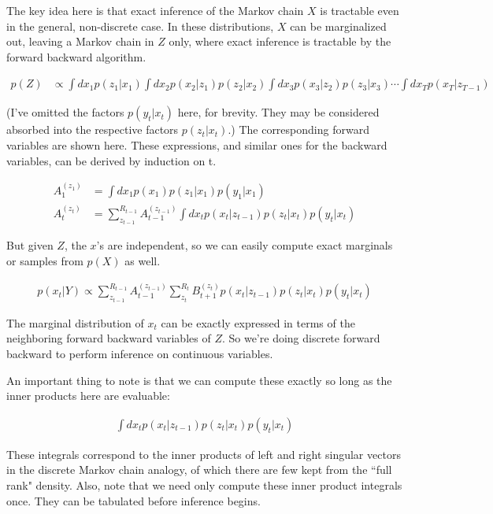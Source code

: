 \documentclass[11pt]{article}
\begin{document}
The key idea here is that exact inference of the Markov chain $X$ is tractable even in the general, non-discrete case. In these distributions, $X$ can be marginalized out, leaving a Markov chain in $Z$ only, where exact inference is tractable by the forward backward algorithm.

\begin{align*}
p(Z) &\propto \int dx_1 p(z_1|x_1) \int dx_2 p(x_2|z_1) p(z_2|x_2) \int dx_3 p(x_3|z_2) p(z_3|x_3) \cdots \int dx_T p(x_T|z_{T-1})
\end{align*}

\noindent (I've omitted the factors $p(y_t|x_t)$ here, for brevity. They may be considered absorbed into the respective factors $p(z_t|x_t)$.) The corresponding forward variables are shown here. These expressions, and similar ones for the backward variables, can be derived by induction on t.

\begin{align*}
A_1^{(z_1)} &= \int dx_1 p(x_1) p(z_1|x_1) p(y_1|x_1)\\
A_t^{(z_t)} &= \sum_{z_{t-1}}^{R_{t-1}} A_{t-1}^{(z_{t-1})} \int dx_t p(x_t|z_{t-1}) p(z_t|x_t) p(y_t|x_t)
\end{align*}

\noindent But given $Z$, the $x$'s are independent, so we can easily compute exact marginals or samples from $p(X)$ as well.

\begin{align*}
p(x_t|Y) \propto \sum_{z_{t-1}}^{R_{t-1}} A_{t-1}^{(z_{t-1})} \sum_{z_t}^{R_t} B_{t+1}^{(z_t)} p(x_t|z_{t-1}) p(z_t|x_t) p(y_t|x_t)
\end{align*}

\noindent The marginal distribution of $x_t$ can be exactly expressed in terms of the neighboring forward backward variables of $Z$. So we’re doing discrete forward backward to perform inference on continuous variables.

An important thing to note is that we can compute these exactly so long as the inner products here are evaluable:

\begin{align*}
\int dx_t p(x_t|z_{t-1}) p(z_t|x_t) p(y_t|x_t)
\end{align*}

\noindent These integrals correspond to the inner products of left and right singular vectors in the discrete Markov chain analogy, of which there are few kept from the ``full rank" density. Also, note that we need only compute these inner product integrals once. They can be tabulated before inference begins.
\end{document}
